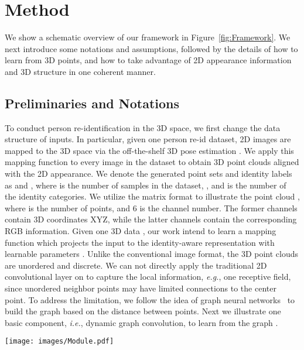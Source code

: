 \documentclass[journal]{IEEEtran}
\def\eg{\emph{e.g.}}
\def\ie{\emph{i.e.}}
\begin{document}
\section{Method} \label{sec:method}
We show a schematic overview of our framework in Figure~\ref{fig:Framework}. We next introduce some notations and assumptions, followed by the details of how to learn from 3D points, and how to take advantage of 2D appearance information and 3D structure in one coherent manner. 

\subsection{Preliminaries and Notations}
To conduct person re-identification in the 3D space, we first change the data structure of inputs. In particular, given one person re-id dataset, 2D images are mapped to the 3D space via the off-the-shelf 3D pose estimation \cite{kanazawaHMR18}. We apply this mapping function to every image in the dataset to obtain 3D point clouds aligned with the 2D appearance. We denote the generated point sets and identity labels as  and , where  is the number of samples in the dataset, , and  is the number of the identity categories. 
We utilize the matrix format to illustrate the point cloud  , where  is the number of points, and 6 is the channel number. The former  channels contain 3D coordinates XYZ, while the latter  channels contain the corresponding RGB information. Given one 3D data  , our work intend to learn a mapping function  which projects the input  to the identity-aware representation  with learnable parameters . Unlike the conventional image format, the 3D point clouds are unordered and discrete. We can not directly apply the traditional 2D convolutional layer on  to capture the local information, \eg, one  receptive field, since unordered neighbor points may have limited connections to the center point. To address the limitation, we follow the idea of graph neural networks~\cite{scarselli2008graph} to build the graph  based on the distance between points. Next we illustrate one basic component, \ie, dynamic graph convolution, to learn from the graph . 

\begin{figure*}[t]
  \begin{center}
    \texttt{[image: images/Module.pdf]}
  \end{center}  
\caption{Visualization of Omni-scale Module. We provide the feature shape as the format of . For instance,  denotes the feature of  points with -dim attribute. (a) We show the basic Omni-scale module without downsampling. (b) We show the Omni-scale module with downsampling, which is similar to the conventional pooling layer. The module distills the number of the points and improves the training efficiency. 
  The dash line denotes the short-cut connection. Besides, we highlight two function types, \ie, cross-point functions and per-point functions, in \textcolor{red}{red}. The cross-point function aggregates the feature among neighbor points, while the per-point function only considers the single-point feature. The proposed Omni-scale module consists of these two kinds of functions.}
  \label{fig:module}
\end{figure*}
 
\end{document}
